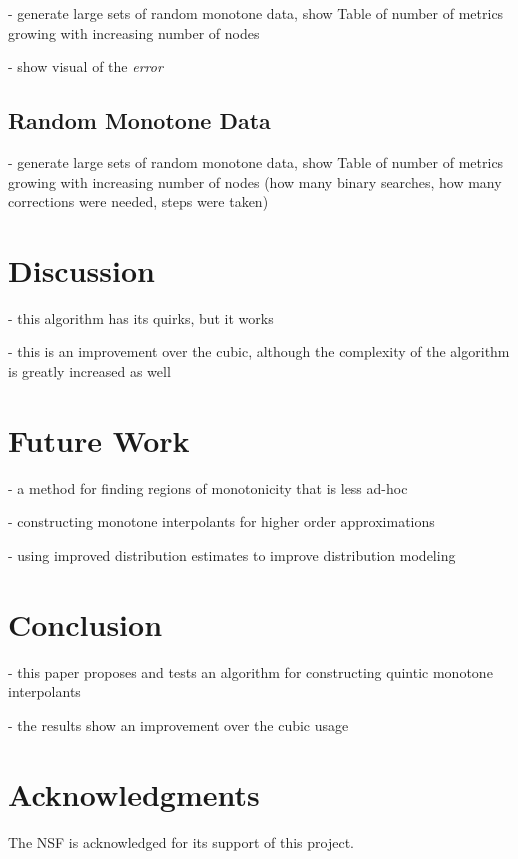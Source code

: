\documentclass{scspaperproc}
\theoremstyle{scsthe}
\begin{document}
- generate large sets of random monotone data, show Table of number
  of metrics growing with increasing number of nodes

- show visual of the \textit{error} 

\subsection{Random Monotone Data}

- generate large sets of random monotone data, show Table of number
  of metrics growing with increasing number of nodes (how many binary
  searches, how many corrections were needed, steps were taken)

\section{Discussion}

- this algorithm has its quirks, but it works

- this is an improvement over the cubic, although the complexity of
  the algorithm is greatly increased as well

\section{Future Work}

- a method for finding regions of monotonicity that is less ad-hoc 

- constructing monotone interpolants for higher order approximations

- using improved distribution estimates to improve distribution modeling

\section{Conclusion}

- this paper proposes and tests an algorithm for constructing quintic
  monotone interpolants

- the results show an improvement over the cubic usage




\section*{Acknowledgments}
The NSF is acknowledged for its support of this project.



\end{document}
